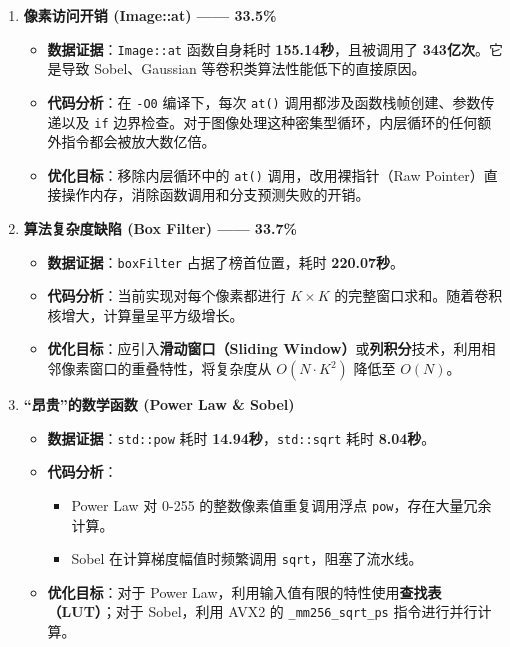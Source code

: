 \documentclass[a4paper]{article}
\begin{document}
\begin{enumerate}
    \item \textbf{像素访问开销 (Image::at) —— 33.5\%}
    \begin{itemize}
        \item \textbf{数据证据}：\texttt{Image::at} 函数自身耗时 \textbf{155.14秒}，且被调用了 \textbf{343亿次}。它是导致 Sobel、Gaussian 等卷积类算法性能低下的直接原因。
        \item \textbf{代码分析}：在 \texttt{-O0} 编译下，每次 \texttt{at()} 调用都涉及函数栈帧创建、参数传递以及 \texttt{if} 边界检查。对于图像处理这种密集型循环，内层循环的任何额外指令都会被放大数亿倍。
        \item \textbf{优化目标}：移除内层循环中的 \texttt{at()} 调用，改用裸指针（Raw Pointer）直接操作内存，消除函数调用和分支预测失败的开销。
    \end{itemize}

    \item \textbf{算法复杂度缺陷 (Box Filter) —— 33.7\%}
    \begin{itemize}
        \item \textbf{数据证据}：\texttt{boxFilter} 占据了榜首位置，耗时 \textbf{220.07秒}。
        \item \textbf{代码分析}：当前实现对每个像素都进行 $K \times K$ 的完整窗口求和。随着卷积核增大，计算量呈平方级增长。
        \item \textbf{优化目标}：应引入\textbf{滑动窗口（Sliding Window）}或\textbf{列积分}技术，利用相邻像素窗口的重叠特性，将复杂度从 $O(N \cdot K^2)$ 降低至 $O(N)$。
    \end{itemize}

    \item \textbf{“昂贵”的数学函数 (Power Law \& Sobel)}
    \begin{itemize}
        \item \textbf{数据证据}：\texttt{std::pow} 耗时 \textbf{14.94秒}，\texttt{std::sqrt} 耗时 \textbf{8.04秒}。
        \item \textbf{代码分析}：
        \begin{itemize}
            \item Power Law 对 0-255 的整数像素值重复调用浮点 \texttt{pow}，存在大量冗余计算。
            \item Sobel 在计算梯度幅值时频繁调用 \texttt{sqrt}，阻塞了流水线。
        \end{itemize}
        \item \textbf{优化目标}：对于 Power Law，利用输入值有限的特性使用\textbf{查找表（LUT）}；对于 Sobel，利用 AVX2 的 \texttt{\_mm256\_sqrt\_ps} 指令进行并行计算。
    \end{itemize}


\end{enumerate}
\end{document}
